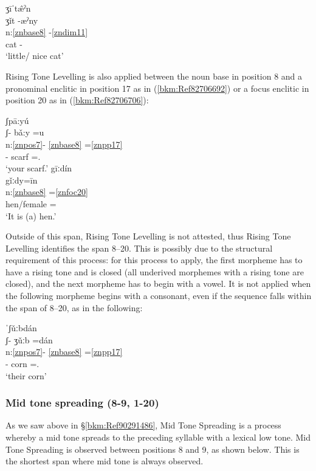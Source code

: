 \documentclass[output=paper]{langscibook}
\begin{document}
\ea\label{ex:key:zap:140}
{ʒīˈt\^{æ}ˀn}\\
\glll ʒǐt -æˀny\\
n:\ref{znbase8}  -\ref{zndim11}\\
 cat -\Dim{}\\
\glt  `little/ nice cat'
\z

Rising Tone Levelling is also applied between the noun base in position 8 and a pronominal enclitic in position 17 as in (\ref{bkm:Ref82706692}) or a focus enclitic in position 20 as in (\ref{bkm:Ref82706706}):

\ea\label{bkm:Ref82706692}
{ʃpā:yú}\\
\glll ʃ{}- bǎ:y =u\\
n:\ref{znpos7}- \ref{znbase8} =\ref{znpp17}\\
\Poss{}- scarf =\Second\Sg{}.\Inf{}\\
\glt `your scarf.'
\ex\label{bkm:Ref82706706}
{gīːdín}\\
\glll gǐːdy=īn\\
n:\ref{znbase8}  =\ref{znfoc20}\\
hen/female =\Foc{}\\
\glt `It is (a) hen.'
\z

Outside of this span, Rising Tone Levelling is not attested, thus Rising Tone Levelling identifies the span 8--20. This is possibly due to the structural requirement of this process: for this process to apply, the first morpheme has to have a rising tone and is closed (all underived morphemes with a rising tone are closed), and the next morpheme has to begin with a vowel. It is not applied when the following morpheme begins with a consonant, even if the sequence falls within the span of 8--20, as in the following: 

\ea\label{ex:key:zap:143}
{ˈʃǔːbdán}\\
\glll ʃ- ʒǔːb =dán\\
n:\ref{znpos7}- \ref{znbase8} =\ref{znpp17}\\
\Poss{}- corn =\Third\Pl{}.\Inf{}\\
\glt `their corn'
\z

\subsubsection{Mid tone spreading (8-9, 1-20)}\label{bkm:Ref83199043}
As we saw above in §\ref{bkm:Ref90291486}, Mid Tone Spreading is a process whereby a mid tone spreads to the preceding syllable with a lexical low tone. Mid Tone Spreading is observed between positions 8 and 9, as shown below. This is the shortest span where mid tone is always observed.
\end{document}

